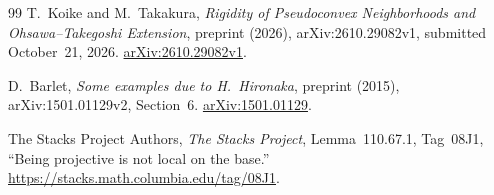 \documentclass[11pt]{amsart}
\theoremstyle{definition}
\theoremstyle{remark}
\numberwithin{equation}{section}
\begin{document}
\begin{thebibliography}{99}
T.~Koike and M.~Takakura,
\emph{Rigidity of Pseudoconvex Neighborhoods and Ohsawa--Takegoshi Extension},
preprint (2026), arXiv:2610.29082v1, submitted October~21, 2026.
\href{https://arxiv.org/abs/2610.29082v1}{arXiv:2610.29082v1}.

D.~Barlet,
\emph{Some examples due to H.~Hironaka},
preprint (2015), arXiv:1501.01129v2, Section~6.
\href{https://arxiv.org/abs/1501.01129}{arXiv:1501.01129}.

The Stacks Project Authors,
\emph{The Stacks Project},
Lemma~110.67.1, Tag~08J1, ``Being projective is not local on the base.''
\url{https://stacks.math.columbia.edu/tag/08J1}.

\end{thebibliography}
\end{document}
